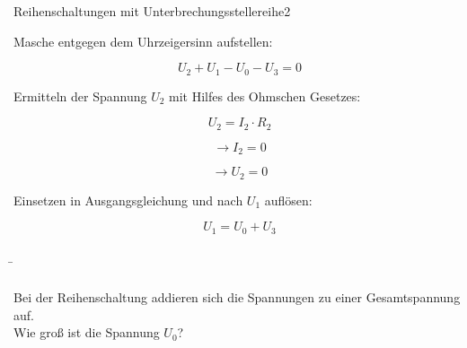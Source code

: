 \begin{frame}
{\begin{bsp}{Reihenschaltungen mit Unterbrechungsstelle}{reihe2}
			\begin{center}

				
				
			\end{center}
			
			Masche entgegen dem Uhrzeigersinn aufstellen:
			
			
			\begin{equation*}
				U_2+U_1-U_0-U_3 = 0
			\end{equation*}
			
			Ermitteln der Spannung $U_2$ mit Hilfes des Ohmschen Gesetzes:
			
			
			\begin{equation*}
				U_2=I_2 \cdot R_2
			\end{equation*}
			
			\begin{equation*}
				\rightarrow I_2 = 0
			\end{equation*}
			
			\begin{equation*}
				\rightarrow U_2 = 0
			\end{equation*}
			
			Einsetzen in Ausgangsgleichung und nach $U_1$ auflösen:		
			
			\begin{equation*}
				U_1 = U_0 + U_3
			\end{equation*}

			
		\end{bsp}
		
	}
	
	\newpage
	
	\b{
		
		\begin{columns}
			
			\vspace{-50pt}
			Bei der Reihenschaltung addieren sich die Spannungen zu einer
			Gesamtspannung auf.\\
			Wie groß ist die Spannung $U_0$?
			
			
			
			


\end{columns}}
\end{frame}
